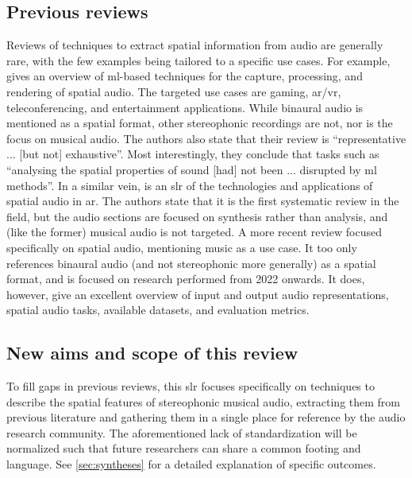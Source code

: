 \documentclass[referee,pdflatex,sn-mathphys-num]{sn-jnl}%
\newcommand{\q}[1]{\enquote{#1}}
\begin{document}
\subsection{Previous reviews}
\label{sec:previous_reviews}
Reviews of techniques to extract spatial information from audio are generally rare, with the few examples being tailored to a specific use cases. For example, \cite{cobosOverviewMachineLearning2022} gives an overview of \gls{ml}-based techniques for the capture, processing, and rendering of spatial audio. The targeted use cases are gaming, \gls{ar}/\gls{vr}, teleconferencing, and entertainment applications. While binaural audio is mentioned as a spatial format, other stereophonic recordings are not, nor is the focus on musical audio. The authors also state that their review is \q{representative ... [but not] exhaustive}. Most interestingly, they conclude that tasks such as \q{analysing the spatial properties of sound [had] not been ... disrupted by \gls{ml} methods}. In a similar vein, \cite{yangAudioAugmentedReality2022} is an \gls{slr} of the technologies and applications of spatial audio in \gls{ar}. The authors state that it is the first systematic review in the field, but the audio sections are focused on synthesis rather than analysis, and (like the former) musical audio is not targeted. A more recent review \cite{zhuASAudioSurveyAdvanced2025} focused specifically on spatial audio, mentioning music as a use case. It too only references binaural audio (and not stereophonic more generally) as a spatial format, and is focused on research performed from 2022 onwards. It does, however, give an excellent overview of input and output audio representations, spatial audio tasks, available datasets, and evaluation metrics.

\subsection{New aims and scope of this review}
\label{sec:new_aims}
To fill gaps in previous reviews, this \gls{slr} focuses specifically on techniques to describe the spatial features of stereophonic musical audio, extracting them from previous literature and gathering them in a single place for reference by the audio research community. The aforementioned lack of standardization will be normalized such that future researchers can share a common footing and language. See \cref{sec:syntheses} for a detailed explanation of specific outcomes.
\end{document}
